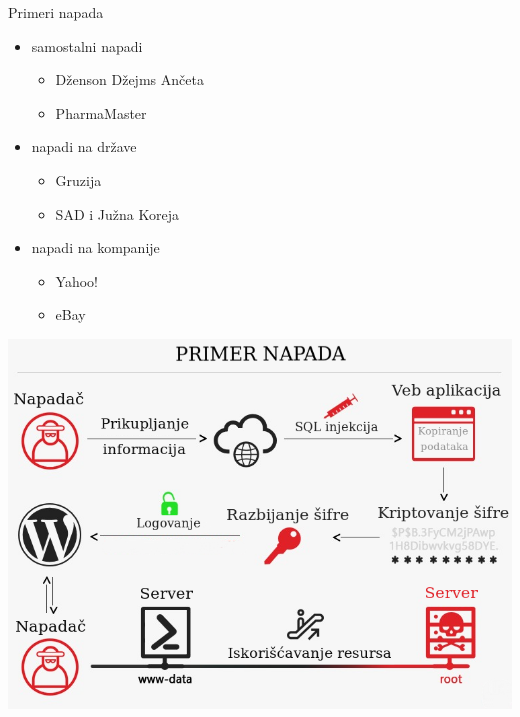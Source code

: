 \begin{frame}{Primeri napada}

	\noindent\begin{minipage}{0.55\linewidth}
    \begin{itemize}

    \item samostalni napadi
    	\begin{itemize}
    		\item Dženson Džejms Ančeta
    		\item PharmaMaster
    	\end{itemize}
    
    \item napadi na države
    	\begin{itemize}
    		\item Gruzija
    		\item SAD i Južna Koreja
    	\end{itemize}
    	
    \item napadi na kompanije
    	\begin{itemize}
    		\item Yahoo!
    		\item eBay
    	\end{itemize}
    \end{itemize}
        \end{minipage}
        
        \hfill
        \begin{minipage}[t]{0.5\linewidth}
            \centering
	        \vspace{-4cm}
            \includegraphics[scale = 0.2]{images/napad.png}
        \end{minipage}
    
    \end{frame}
    

